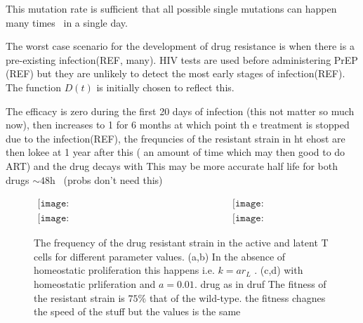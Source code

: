 \documentclass[DIV=15]{scrartcl}
\begin{document}
This  mutation rate is sufficient that  all possible single mutations can happen many  times~\cite{coffin1995} in a single day.


The worst case scenario for the development of drug resistance is  when there is a pre-existing infection(REF, many).  HIV tests are used before  administering PrEP (REF) but they are unlikely to detect the  most early stages of infection(REF). The function $D(t)$ is initially chosen to reflect this.


The efficacy  is zero during the first 20 days of infection (this not matter so much now), then increases to 1 for $6$ months at which point th e treatment is stopped due to the infection(REF), the frequncies of  the resistant strain in ht ehost are then lokee at 1 year after this ( an amount of time which may then good to do ART) and the drug decays with This may be more accurate half life for both drugs $\sim 48$h~\cite{patterson2011}
(probs don't need this) 
 
 

\begin{figure*}[h]
 \begin{center}$
 \begin{array}{cc}
 \texttt{[image: NoHomeo\_Active\_S1\_HigFit075\_09\_06b.png]} &
 \texttt{[image: NoHomeo\_Reservoir\_S1\_HigFit075\_09\_06b.png]} \\
  \texttt{[image: Homeo\_Active\_S1\_HigFit075\_09\_06b.png]} &
 \texttt{[image: Homeo\_Reservoir\_S1\_HigFit075\_09\_06b.png]}
 \end{array}$
 \end{center}
 \caption{The frequency of the drug resistant strain in the active and latent T cells for different parameter values. (a,b) In the absence of homeostatic proliferation this happens i.e. $k = ar_L$ . (c,d) with homeostatic prliferation and $a = 0.01$.  drug as in druf 
 The fitness of the resistant strain is $75\%$ that of the wild-type. the fitness chagnes  the speed  of the stuff but the values is the same  }
 \label{within host parameter sweep}
 \end{figure*}
 
\end{document}
